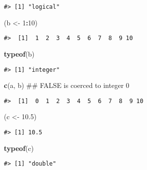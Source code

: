 \documentclass[]{book}
\newenvironment{Shaded}{\begin{snugshade}}{\end{snugshade}}
\newcommand{\KeywordTok}[1]{\textcolor[rgb]{0.13,0.29,0.53}{\textbf{#1}}}
\newcommand{\DecValTok}[1]{\textcolor[rgb]{0.00,0.00,0.81}{#1}}
\newcommand{\FloatTok}[1]{\textcolor[rgb]{0.00,0.00,0.81}{#1}}
\newcommand{\StringTok}[1]{\textcolor[rgb]{0.31,0.60,0.02}{#1}}
\newcommand{\OperatorTok}[1]{\textcolor[rgb]{0.81,0.36,0.00}{\textbf{#1}}}
\newcommand{\NormalTok}[1]{#1}
\theoremstyle{definition}
\theoremstyle{definition}
\theoremstyle{definition}
\theoremstyle{remark}
\begin{document}
\begin{verbatim}
#> [1] "logical"
\end{verbatim}

\begin{Shaded}
\begin{Highlighting}[]
\NormalTok{(b <-}\StringTok{ }\DecValTok{1}\OperatorTok{:}\DecValTok{10}\NormalTok{)}
\end{Highlighting}
\end{Shaded}

\begin{verbatim}
#>  [1]  1  2  3  4  5  6  7  8  9 10
\end{verbatim}

\begin{Shaded}
\begin{Highlighting}[]
\KeywordTok{typeof}\NormalTok{(b)}
\end{Highlighting}
\end{Shaded}

\begin{verbatim}
#> [1] "integer"
\end{verbatim}

\begin{Shaded}
\begin{Highlighting}[]
\KeywordTok{c}\NormalTok{(a, b)         ## FALSE is coerced to integer 0}
\end{Highlighting}
\end{Shaded}

\begin{verbatim}
#>  [1]  0  1  2  3  4  5  6  7  8  9 10
\end{verbatim}

\begin{Shaded}
\begin{Highlighting}[]
\NormalTok{(c <-}\StringTok{ }\FloatTok{10.5}\NormalTok{)}
\end{Highlighting}
\end{Shaded}

\begin{verbatim}
#> [1] 10.5
\end{verbatim}

\begin{Shaded}
\begin{Highlighting}[]
\KeywordTok{typeof}\NormalTok{(c)}
\end{Highlighting}
\end{Shaded}

\begin{verbatim}
#> [1] "double"
\end{verbatim}
\end{document}
